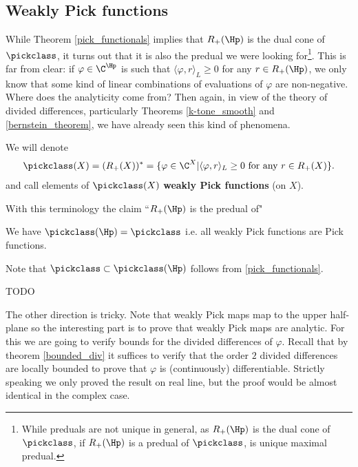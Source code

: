 \subsection{Weakly Pick functions}

While Theorem \ref{pick_functionals} implies that $R_{+}(\Hp)$ is the dual cone of $\pickclass$, it turns out that it is also the predual we were looking for\footnote{While preduals are not unique in general, as $R_{+}(\Hp)$ is the dual cone of $\pickclass$, if $R_{+}(\Hp)$ is a predual of $\pickclass$, is unique maximal predual.}. This is far from clear: if $\varphi \in \C^{\Hp}$ is such that $\langle \varphi, r \rangle_{L} \geq 0$ for any $r \in R_{+}(\Hp)$, we only know that some kind of linear combinations of evaluations of $\varphi$ are non-negative. Where does the analyticity come from? Then again, in view of the theory of divided differences, particularly Theorems \ref{k-tone_smooth} and \ref{bernstein_theorem}, we have already seen this kind of phenomena.

\begin{maar}
	We will denote
	\begin{align*}
		\pickclass(X) = (R_{+}(X))^{*} = \{\varphi \in \C^{X} | \langle \varphi, r \rangle_{L} \geq 0 \text{ for any $r \in R_{+}(X)$}\}.
	\end{align*}
	and call elements of $\pickclass(X)$ \textbf{weakly Pick functions} (on $X$).
\end{maar}

With this terminology the claim ``$R_{+}(\Hp)$ is the predual of"

\begin{lause}
	We have $\pickclass(\Hp) = \pickclass$ i.e. all weakly Pick functions are Pick functions.
\end{lause}

Note that $\pickclass \subset \pickclass(\Hp)$ follows from \ref{pick_functionals}.

TODO

The other direction is tricky. Note that weakly Pick maps map to the upper half-plane so the interesting part is to prove that weakly Pick maps are analytic. For this we are going to verify bounds for the divided differences of $\varphi$. Recall that by theorem \ref{bounded_div} it suffices to verify that the order $2$ divided differences are locally bounded to prove that $\varphi$ is (continuously) differentiable. Strictly speaking we only proved the result on real line, but the proof would be almost identical in the complex case.


